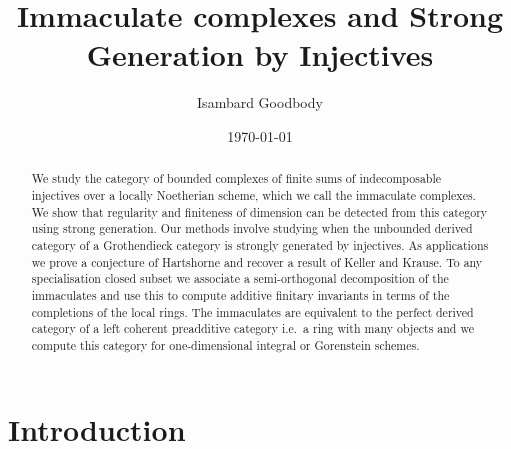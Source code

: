 \documentclass[12pt,oneside]{amsart}
\title{Immaculate complexes and Strong Generation by Injectives}
\author{Isambard Goodbody}
\date{\today}
\begin{document}
\usetikzlibrary{matrix}
\usetikzlibrary{shapes}


\theoremstyle{plain}
\newtheorem{prop}{Proposition}[section]
\newtheorem{lemma}[prop]{Lemma}
\newtheorem{theorem}[prop]{Theorem}
\newtheorem{cor}[prop]{Corollary}
\newtheorem{quest}[prop]{Question}

\theoremstyle{definition}
\newtheorem{defn}[prop]{Definition}
\newtheorem{ass}[prop]{Assumption}
\newtheorem{conj}[prop]{Conjecture}
\newtheorem{ex}[prop]{Example}
\newtheorem{remark}[prop]{Remark}
\newtheorem{notation}[prop]{Notation}
\newtheorem*{ack}{Acknowledgements}
\newtheorem*{AID}{AI Declaration}



\begin{abstract}
We study the category of bounded complexes of finite sums of indecomposable injectives over a locally Noetherian scheme, which we call the immaculate complexes. We show that regularity and finiteness of dimension can be detected from this category using strong generation. Our methods involve studying when the unbounded derived category of a Grothendieck category is strongly generated by injectives. As applications we prove a conjecture of Hartshorne and recover a result of Keller and Krause. To any specialisation closed subset we associate a semi-orthogonal decomposition of the immaculates and use this to compute additive finitary invariants in terms of the completions of the local rings. The immaculates are equivalent to the perfect derived category of a left coherent preadditive category i.e.\ a ring with many objects and we compute this category for one-dimensional integral or Gorenstein schemes. 
\end{abstract}

\maketitle











\tableofcontents


\section{Introduction}
\end{document}
